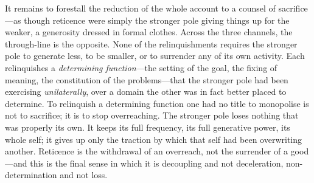 It remains to forestall the reduction of the whole account to a counsel of sacrifice---as though reticence were simply the stronger pole giving things up for the weaker, a generosity dressed in formal clothes. Across the three channels, the through-line is the opposite. None of the relinquishments requires the stronger pole to generate less, to be smaller, or to surrender any of its own activity. Each relinquishes a \emph{determining function}---the setting of the goal, the fixing of meaning, the constitution of the problems---that the stronger pole had been exercising \emph{unilaterally}, over a domain the other was in fact better placed to determine. To relinquish a determining function one had no title to monopolise is not to sacrifice; it is to stop overreaching. The stronger pole loses nothing that was properly its own. It keeps its full frequency, its full generative power, its whole self; it gives up only the traction by which that self had been overwriting another. Reticence is the withdrawal of an overreach, not the surrender of a good---and this is the final sense in which it is decoupling and not deceleration, non-determination and not loss.
